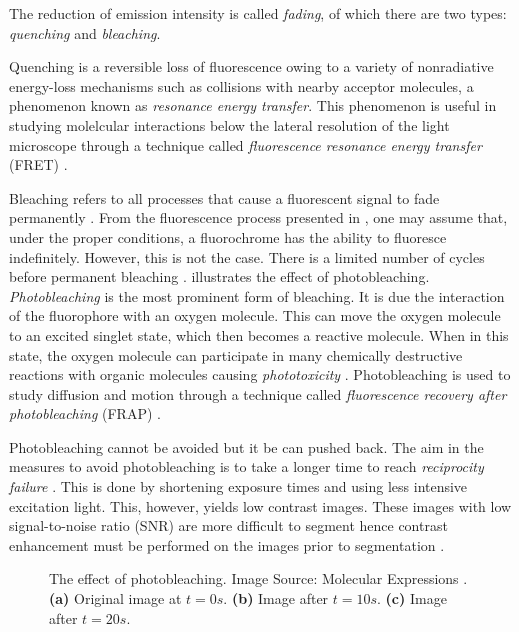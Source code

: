 \begin{definition}[Fading]
	The reduction of emission intensity is called \textit{fading}, of which there are two types: \textit{quenching} and \textit{bleaching}.
	
	Quenching is a reversible loss of fluorescence owing to a variety of nonradiative energy-loss mechanisms such as collisions with nearby acceptor molecules, a phenomenon known as \textit{resonance energy transfer}.
	This phenomenon is useful in studying molelcular interactions below the lateral resolution of the light microscope through a technique called \textit{fluorescence resonance energy transfer} (FRET) \cite{Spring2003,Danek2012,LichtmanConchello2005}.
	
	Bleaching refers to all processes that cause a fluorescent signal to fade permanently \citep{LichtmanConchello2005}.
	From the fluorescence process presented in , one may assume that, under the proper conditions, a fluorochrome has the ability to fluoresce indefinitely.
	However, this is not the case. There is a limited number of cycles before permanent bleaching \citep{LichtmanConchello2005}.
	 illustrates the effect of photobleaching.
	\textit{Photobleaching} is the most prominent form of bleaching.
	It is due the interaction of the fluorophore with an oxygen molecule.
	This can move the oxygen molecule to an excited singlet state, which then becomes a reactive molecule.
	When in this state, the oxygen molecule can participate in many chemically destructive reactions with organic molecules causing \textit{phototoxicity} \citep{Danek2012}.
	Photobleaching is used to study diffusion and motion through a technique called \textit{fluorescence recovery after photobleaching} (FRAP) \citep{LichtmanConchello2005,AbramowitzDavidson2016}.
	
	Photobleaching cannot be avoided but it be can pushed back.
	The aim in the measures to avoid photobleaching is to take a longer time to reach \textit{reciprocity failure} \citep{AbramowitzDavidson2016}.
	This is done by shortening exposure times and using less intensive excitation light.
	This, however, yields low contrast images.
	These images with low signal-to-noise \citep{Murphy2001} ratio (SNR) are more difficult to segment hence contrast enhancement must be performed on the images prior to segmentation \citep{Boppart2005}.
	\begin{figure}[!t]
		\centering
		\caption{The effect of photobleaching. Image Source: Molecular Expressions \citep{MolecularExpressionsPhotobleaching}. 
			\textbf{(a)} Original image at $t=0s$.
			\textbf{(b)} Image after $t=10s$.
			\textbf{(c)} Image after $t=20s$.
			}
		\label{fig:bleaching}
	\end{figure}
\end{definition}

